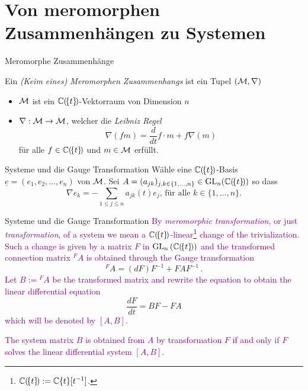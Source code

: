 \section{Von meromorphen Zusammenhängen zu Systemen}
\begin{frame}[t]{Meromorphe Zusammenhänge}
  \begin{defn}
    Ein \emph{(Keim eines) Meromorphen Zusammenhangs} ist ein Tupel
    $(\mathcal{M},\nabla)$
    \begin{itemize}
    \item<2-> $\mathcal{M}$ ist ein $\mathbb{C}(\!\{t\}\!)$-Vektorraum von Dimension $n$
    \item<3-> $\nabla:\mathcal{M}\to \mathcal{M}$, welcher die \emph{Leibniz Regel}
      \[
        \nabla(fm)=\frac{d}{dt} f \cdot m + f \nabla(m)
      \]
      für alle $f\in\mathbb{C}(\!\{t\}\!)$ und $m\in\mathcal{M}$ erfüllt.
    \end{itemize}
  \end{defn}
\end{frame}
\begin{frame}[t]{Systeme und die Gauge Transformation}
  Wähle eine $\mathbb{C}(\!\{t\}\!)$-Basis $\underline{e}=(e_1,e_2,\dots,e_n)$ von
  $\mathcal{M}$.
  Sei $A=(a_{jk})_{j,k\in\{1,\dots,n\}}\in\operatorname{GL}_n(\mathbb{C}(\!\{t\}\!))$ so dass
  \[
    \nabla e_k=-\!\!\sum_{1\leq j\leq n}\!\! a_{jk}(t)e_j
    \text{, für alle $k\in\{1,\dots,n\}$.}
  \]

\end{frame}
\begin{frame}[t]{Systeme und die Gauge Transformation}
  \textcolor{purple}{
    By \emph{meromorphic transformation}, or just \emph{transformation}, of a
    system we mean a
    $\mathbb{C}(\!\{t\}\!)$-linear\footnote{$\mathbb{C}(\!\{t\}\!):=\mathbb{C}\{t\}[t^{-1}]$.} change of
    the trivialization.
    Such a change is given by a matrix $F$ in $\operatorname{GL}_n\left(\mathbb{C}(\!\{t\}\!)\right)$
    and the transformed connection matrix ${}^F\!A$ is obtained through the
    Gauge transformation
  }
  \[
    {}^F\!A=(dF)F^{-1} + FAF^{-1} \,.
  \]
  \textcolor{purple}{
    Let $B:={}^F\!A$ be the transformed matrix and rewrite the equation
    to obtain the linear differential equation
  }
  \[
    \frac{dF}{dt}=BF-FA
  \]
  \textcolor{purple}{
    which will be denoted by $[A,B]$.
  }
  \begin{rem}
    \textcolor{purple}{
      The system matrix $B$ is obtained from $A$ by transformation $F$ if and
      only if $F$ solves the linear differential system $[A,B]$.
    }
  \end{rem}
\end{frame}

